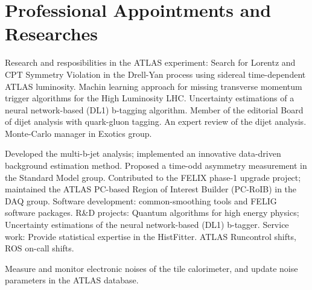 \section{Professional Appointments and Researches}

\begin{cventries}
\end{cventries}

       Research and resposibilities in the ATLAS experiment: \newline
       Search for Lorentz and  CPT Symmetry Violation in the Drell-Yan process using 
       sidereal time-dependent ATLAS luminosity. Machin learning approach for missing 
       transverse momentum trigger algorithms for the High Luminosity LHC. 
        Uncertainty estimations of a neural network-based (DL1) b-tagging algorithm.\newline
        Member of the editorial Board of dijet analysis with quark-gluon tagging. 
        An expert review of the dijet analysis. \newline
        Monte-Carlo manager in Exotics group.  \newline
 
 \begin{cventries}   
  \end{cventries}
       Developed the multi-b-jet analysis; implemented an innovative data-driven background
       estimation method. Proposed a time-odd asymmetry measurement in the Standard Model group. \newline
        Contributed to the FELIX phase-1 upgrade project; maintained the ATLAS PC-based Region of 
        Interest Builder (PC-RoIB) in the DAQ group. \newline
        Software development: common-smoothing tools and FELIG software packages. \newline
        R&D projects: Quantum algorithms for high energy physics; Uncertainty estimations 
        of the neural network-based (DL1) b-tagger. \newline
        Service work: Provide statistical expertise in the HistFitter. ATLAS Runcontrol shifts,
        ROS on-call shifts. \newline

    

\begin{cventries}
\end{cventries}
        Measure and monitor electronic noises of the tile calorimeter, and update noise parameters in the  ATLAS database.
 
